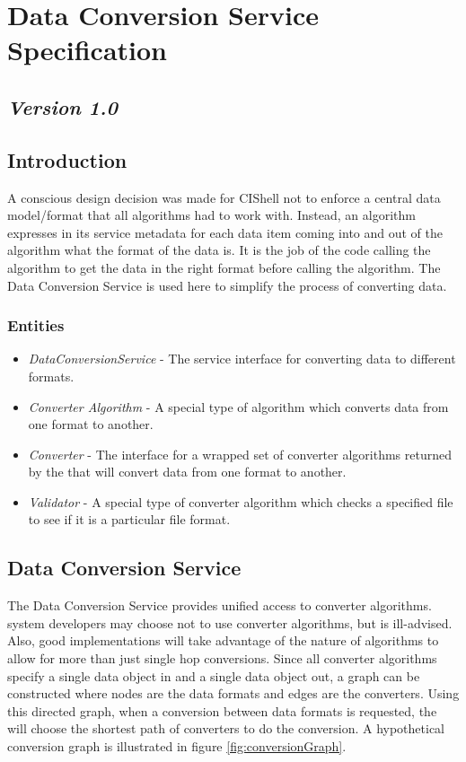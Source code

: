 \chapter{Data Conversion Service Specification}
\section*{\textit{Version 1.0}}
\section{Introduction}

A conscious design decision was made for CIShell not to enforce a central data
model/format that all algorithms had to work with. Instead, an algorithm
expresses in its service metadata for each data item coming into and out of the
algorithm what the format of the data is. It is the job of the code calling the
algorithm to get the data in the right format before calling the algorithm. The
Data Conversion Service is used here to simplify the process of converting data.

\subsection{Entities}

\begin{itemize}
  \item \textit{DataConversionService} - The service interface for converting
  data to different formats.
  \item \textit{Converter Algorithm} - A special type of algorithm which
  converts data from one format to another.
  \item \textit{Converter} - The interface for a wrapped set of converter
  algorithms returned by the  that will convert
  data from one format to another.
  \item \textit{Validator} - A special type of converter algorithm which checks
  a specified file to see if it is a particular file format. 
\end{itemize}

\section{Data Conversion Service}

The Data Conversion Service provides unified access to converter algorithms.
 system developers may choose not to use converter
algorithms, but is ill-advised. Also, good implementations will take advantage of
the nature of algorithms to allow for more than just single hop conversions.
Since all converter algorithms specify a single data object in and a single data
object out, a graph can be constructed where nodes are the data formats and edges
are the converters. Using this directed graph, when a conversion between data
formats is requested, the  will choose the shortest
path of converters to do the conversion. A hypothetical conversion graph is
illustrated in figure \ref{fig:conversionGraph}.

